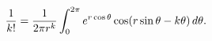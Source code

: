 \[\frac{1}{k!}=\frac{1}{2\pi r^{k}}\int_{0}^{2\pi}e^{r\mathop{\cos\/}\nolimits%
\theta}\mathop{\cos\/}\nolimits\!\left(r\mathop{\sin\/}\nolimits\theta-k\theta%
\right)d\theta.\]